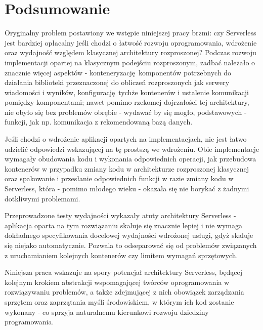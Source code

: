 \documentclass[oneside]{mgr}
\begin{document}
\chapter{Podsumowanie}
Oryginalny problem postawiony we wstępie niniejszej pracy brzmi: czy Serverless jest bardziej opłacalny jeśli chodzi o łatwość rozwoju oprogramowania, wdrożenie oraz wydajność względem klasycznej architektury rozproszonej? Podczas rozwoju implementacji opartej na klasycznym podejściu rozproszonym, zadbać należało o znacznie więcej aspektów - konteneryzację komponentów potrzebnych do działania biblioteki przeznaczonej do obliczeń rozproszonych jak serwery wiadomości i wyników, konfigurację tychże kontenerów i ustalenie komunikacji pomiędzy komponentami; nawet pomimo rzekomej dojrzałości tej architektury, nie obyło się bez problemów obrębie - wydawać by się mogło, podstawowych - funkcji, jak np. komunikacja z rekomendowaną bazą danych.

Jeśli chodzi o wdrożenie aplikacji opartych na implementacjach, nie jest łatwo udzielić odpowiedzi wskazującej na tę prostszą we wdrożeniu. Obie implementacje wymagały obudowania kodu i wykonania odpowiednich operacji, jak przebudowa kontenerów w przypadku zmiany kodu w architekturze rozproszonej klasycznej oraz spakowanie i przesłanie odpowiednich funkcji w razie zmiany kodu w Serverless, która - pomimo młodego wieku - okazała się nie borykać z żadnymi dotkliwymi problemami.

Przeprowadzone testy wydajności wykazały atuty architektury Serverless - aplikacja oparta na tym rozwiązaniu skaluje się znacznie lepiej i nie wymaga dokładnego specyfikowania docelowej wydajności wdrożonej usługi, gdyż skaluje się niejako automatycznie. Pozwala to odseparować się od problemów związanych z uruchamianiem kolejnych kontenerów czy limitem wymagań sprzętowych.

Niniejsza praca wskazuje na spory potencjał architektury Serverless, będącej kolejnym krokiem abstrakcji wspomagającej twórców oprogramowania w rozwiązywaniu problemów, a także zdejmującej z nich obowiązek zarządzania sprzętem oraz zaprzątania myśli środowiskiem, w którym ich kod zostanie wykonany - co sprzyja naturalnemu kierunkowi rozwoju dziedziny programowania.
\end{document}
